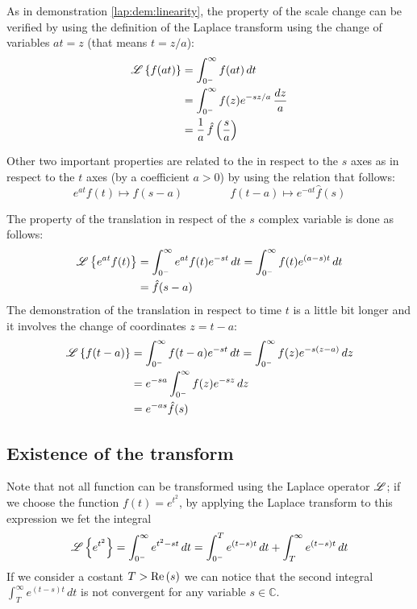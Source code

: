 	\begin{demonstration}
		As in demonstration \ref{lap:dem:linearity}, the property of the scale change can be verified by using the definition of the Laplace transform using the change of variables $at = z$ (that means $t= z/a$):
		\begin{align*}
			\mathscr{L} \left\{ f(at) \right\} & = \int_{0^-}^\infty f(at)\, dt \\
			& = \int_{0^-}^\infty f(z) e^{-sz/a} \, \frac{dz}{a} \\
			& = \frac 1 a \, \hat f\left(\frac s a\right)
		\end{align*}
	\end{demonstration}
		
	Other two important properties are related to the  in respect to the $s$ axes as in respect to the $t$ axes (by a coefficient $a>0$) by using the relation that follows:
	\begin{equation}
		e^{at} f(t) \mapsto \hat f(s-a) \qquad \, \qquad f(t-a) \mapsto e^{-at} \hat f(s)
	\end{equation}

	\begin{demonstration}
		The property of the translation in respect of the $s$ complex variable is done as follows:
		\begin{align*}
			\mathscr{L} \left\{ e^{at}f(t) \right\} & = \int_{0^-}^\infty e^{at} f(t) e^{-st} \, dt = \int_{0^-}^\infty f(t) e^{(a-s)t} \, dt \\ & = \hat f(s-a)
		\end{align*}
		The demonstration of the translation in respect to time $t$ is a little bit longer and it involves the change of coordinates $z = t-a$:
		\begin{align*}
			\mathscr{L} \left\{ f(t-a) \right\} & = \int_{0^-}^\infty f(t-a) e^{-st} \, dt = \int_{0^-}^\infty f(z) e^{-s(z-a)} \, dz \\ 
			& = e^{-sa} \int_{0^-}^\infty f(z) e^{-sz}\, dz \\ & = e^{-as} \hat f(s)
 		\end{align*} 
	\end{demonstration}
	
	\subsection*{Existence of the transform}
		Note that not all function can be transformed using the Laplace operator $\mathscr{L}$; if we choose the function $f(t) = e^{t^2}$, by applying the Laplace transform to this expression we fet the integral
		\[\mathscr{L} \left\{ e^{t^2} \right\} = \int_{0^-}^\infty e ^{t^2-st} \, dt = \int_{0^-}^T e^{(t-s)t}\, dt + \int_T^\infty e^{(t-s)t}\, dt  \]
		If we consider a costant $T > \textrm{Re}\left(s\right)$ we can notice that the second integral $\int_T^\infty e^{(t-s)t}\, dt$ is not convergent for any variable $s\in\mathds C$.
		
